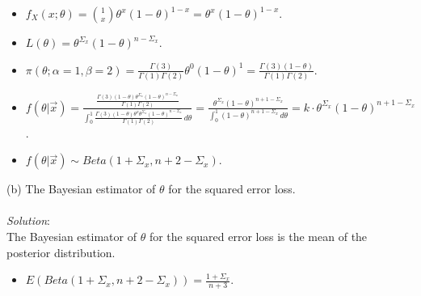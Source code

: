 \documentclass[12pt]{article}
\newcommand{\ds}{\displaystyle}
\begin{document}
\begin{itemize}
    \item $ \ds f_X(x ; \theta) = \binom{1}{x} \theta^{x} (1 - \theta)^{1 - x} = \theta^{x} (1 - \theta)^{1 - x} $. \\
    \item $ \ds L(\theta) = \theta^{\Sigma_{x}} (1 - \theta)^{n - \Sigma_{x}} $. \\
    \item $ \ds \pi(\theta ; \alpha = 1, \beta = 2) = \frac{\Gamma(3)}{\Gamma(1)\Gamma(2)} \theta^{0} (1 - \theta)^{1} = 
    \frac{\Gamma(3)(1 - \theta)}{\Gamma(1)\Gamma(2)} $. \\
    \item $ \ds f(\theta | \overrightarrow{x}) = \frac{ \ds \frac{ \Gamma(3)(1 - \theta) \theta^{\Sigma_{x}} (1 - \theta)^{n - \Sigma_{x} } }{\Gamma(1)\Gamma(2)}}{ \ds \int_{0}^{1}\frac{ \Gamma(3)(1 - \theta) \theta^{x} \theta^{\Sigma_{x}} (1 - \theta)^{n - \Sigma_{x}} }{ \Gamma(1)\Gamma(2)} \, d\theta } = 
    \frac{ \theta^{\Sigma_{x}} (1 - \theta)^{n + 1 - \Sigma_{x}} }{ \ds \int_{0}^{1} (1 - \theta)^{n + 1 - \Sigma_{x}} \, d\theta} = k \cdot \theta^{\Sigma_{x}} (1 - \theta)^{n + 1 - \Sigma_{x}} $. \\
    \item $ \ds f(\theta | \overrightarrow{x}) \sim Beta(1 + \Sigma_{x}, n + 2 - \Sigma_{x}) $. \\
\end{itemize}

\vspace{2.5mm}

\newpage

(b) The Bayesian estimator of $ \theta $ for the squared error loss. \\
\vspace{2.5mm} \\
\textit{Solution}:
\vspace{2.5mm} \\

\noindent
The Bayesian estimator of $ \theta $ for the squared error loss is the mean of the posterior distribution. \\

\begin{itemize}
    \item $ \ds E ( Beta(1 + \Sigma_{x}, n + 2 - \Sigma_{x}) ) = \frac{1 + \Sigma_{x}}{n + 3}$.
\end{itemize}
\end{document}
